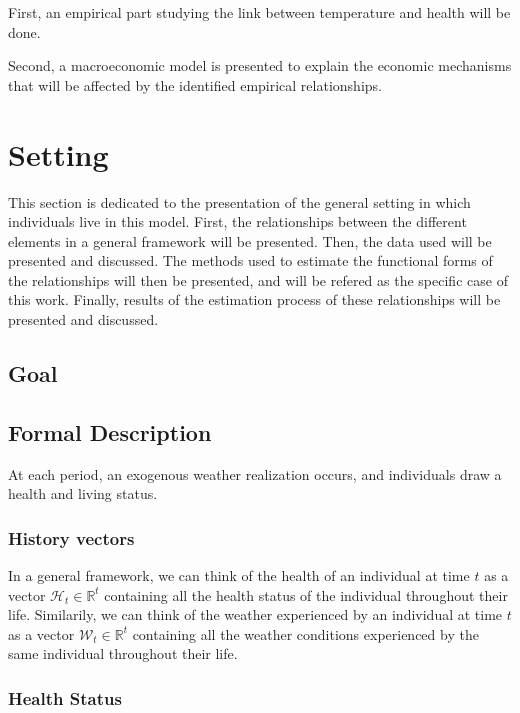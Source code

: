 \documentclass{article}
\begin{document}
First, an empirical part studying the link between temperature and health will be done. 

Second, a macroeconomic model is presented to explain the economic mechanisms that will be affected by the identified empirical relationships.

\section{Setting}

This section is dedicated to the presentation of the general setting
in which individuals live in this model.
First, the relationships between the different elements in a general framework will be presented.
Then, the data used will be presented and discussed. 
The methods used to estimate the functional forms of the relationships will then be 
presented, and will be refered as the specific case of this work.
Finally, results of the estimation process of these relationships will be presented and discussed.

\subsection{Goal}

\subsection{Formal Description}

At each period, an exogenous weather realization occurs, and individuals draw a health and living status. 

\subsubsection{History vectors}

In a general framework, we can think of the health of an individual at time $t$ as a vector $\mathcal{H}_t\in \mathbb{R}^{t}$ containing
all the health status of the individual throughout their life.
Similarily, we can think of the weather experienced by an individual at time $t$ as a vector $\mathcal{W}_t\in \mathbb{R}^{t}$ containing
all the weather conditions experienced by the same individual throughout their life.

\subsubsection{Health Status}
\end{document}
